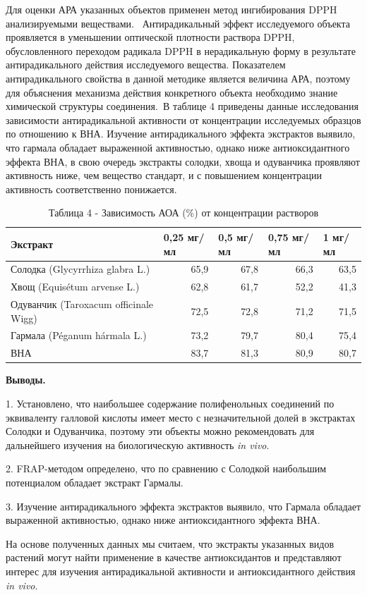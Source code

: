 \begin{multicols}{2}
Для оценки АРА указанных объектов применен метод ингибирования DPPH
анализируемыми веществами.~ Антирадикальный эффект исследуемого объекта
проявляется в уменьшении оптической плотности раствора DPPH,
обусловленного переходом радикала DPPH в нерадикальную форму в
результате антирадикального действия исследуемого вещества. Показателем
антирадикального свойства в данной методике является величина АРА,
поэтому для объяснения механизма действия конкретного объекта необходимо
знание химической структуры соединения.~В таблице 4 приведены данные
исследования зависимости антирадикальной активности от концентрации
исследуемых образцов по отношению к ВНА. Изучение антирадикального
эффекта экстрактов выявило, что гармала обладает выраженной активностью,
однако ниже антиоксидантного эффекта ВНА, в свою очередь экстракты
солодки, хвоща и одуванчика проявляют активность ниже, чем вещество
стандарт, и с повышением концентрации активность соответственно
понижается.
\end{multicols}

\begin{table}[H]
\caption*{Таблица 4 - Зависимость АОА (\%) от концентрации растворов}
\centering
\begin{tabular}{|l|r|r|r|r|}
\hline
Экстракт & \multicolumn{1}{l|}{0,25 мг/мл} & \multicolumn{1}{l|}{0,5 мг/мл} & \multicolumn{1}{l|}{0,75 мг/мл} & \multicolumn{1}{l|}{1 мг/мл} \\ \hline
Солодка (Glycyrrhiza glabra L.)       & 65,9 & 67,8 & 66,3 & 63,5 \\ \hline
Хвощ (Equisétum arvense L.)           & 62,8 & 61,7 & 52,2 & 41,3 \\ \hline
Одуванчик (Taroxacum officinale Wigg) & 72,5 & 72,8 & 71,2 & 71,5 \\ \hline
Гармала (Péganum hármala L.)          & 73,2 & 79,7 & 80,4 & 75,4 \\ \hline
ВНА                                   & 83,7 & 81,3 & 80,9 & 80,7 \\ \hline
\end{tabular}
\end{table}

\begin{multicols}{2}
{\bfseries Выводы.}

1. Установлено, что наибольшее содержание полифенольных соединений по
эквиваленту галловой кислоты имеет место с незначительной долей в
экстрактах Солодки и Одуванчика, поэтому эти объекты можно рекомендовать
для дальнейшего изучения на биологическую активность \emph{in vivo}.

2. FRAP-методом определено, что по сравнению с Солодкой наибольшим
потенциалом обладает экстракт Гармалы.

3. Изучение антирадикального эффекта экстрактов выявило, что Гармала
обладает выраженной активностью, однако ниже антиоксидантного эффекта
ВНА.

На основе полученных данных мы считаем, что экстракты указанных видов
растений могут найти применение в качестве антиоксидантов и представляют
интерес для изучения антирадикальной активности и антиоксидантного
действия \emph{in vivo}.
\end{multicols}

